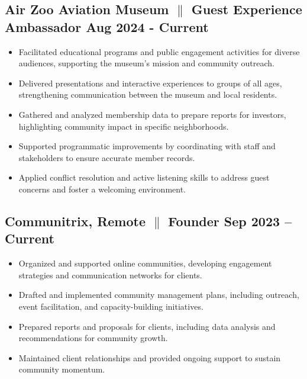 \documentclass[a4paper,12pt]{article} %
\begin{document}
\subsection{\small{ Air Zoo Aviation Museum {$\parallel$} {Guest Experience Ambassador} \hfill \textbf{Aug 2024 - Current}}}
\begin{itemize}
      \item Facilitated educational programs and public engagement activities for diverse audiences, supporting the museum’s mission and community outreach.
      \item Delivered presentations and interactive experiences to groups of all ages, strengthening communication between the museum and local residents.
      \item Gathered and analyzed membership data to prepare reports for investors, highlighting community impact in specific neighborhoods.
      \item Supported programmatic improvements by coordinating with staff and stakeholders to ensure accurate member records.
      \item Applied conflict resolution and active listening skills to address guest concerns and foster a welcoming environment.
\end{itemize}
\subsection{Communitrix, Remote {$\parallel$}{ Founder} \hfill
      \textbf{Sep 2023 – Current}}
\begin{itemize}
      \item Organized and supported online communities, developing engagement strategies and communication networks for clients.
      \item Drafted and implemented community management plans, including outreach, event facilitation, and capacity-building initiatives.
      \item Prepared reports and proposals for clients, including data analysis and recommendations for community growth.
      \item Maintained client relationships and provided ongoing support to sustain community momentum.
\end{itemize}
\end{document}
